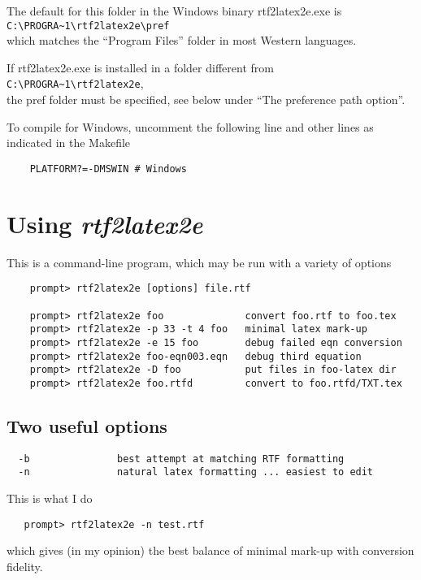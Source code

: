 \documentclass{article}
\def\rtf2latex2e{{\it rtf2latex2e}}
\begin{document}
The default for this folder in the Windows binary rtf2latex2e.exe is\\
\verb|C:\PROGRA~1\rtf2latex2e\pref|\\
which matches the ``Program Files'' folder in most Western languages.

If rtf2latex2e.exe is installed in a folder different from\\
\verb|C:\PROGRA~1\rtf2latex2e|,\\
the pref folder must be specified,
see below under ``The preference path option''.

To compile for Windows, uncomment the following line
and other lines as indicated in the Makefile
\begin{verbatim}
    PLATFORM?=-DMSWIN # Windows
\end{verbatim}

\section{Using \rtf2latex2e}

This is a command-line program, which may be run with a variety of options
\begin{verbatim}
    prompt> rtf2latex2e [options] file.rtf
    
    prompt> rtf2latex2e foo              convert foo.rtf to foo.tex
    prompt> rtf2latex2e -p 33 -t 4 foo   minimal latex mark-up
    prompt> rtf2latex2e -e 15 foo        debug failed eqn conversion
    prompt> rtf2latex2e foo-eqn003.eqn   debug third equation 
    prompt> rtf2latex2e -D foo           put files in foo-latex dir
    prompt> rtf2latex2e foo.rtfd         convert to foo.rtfd/TXT.tex
\end{verbatim}

\subsection{Two useful options}
\begin{verbatim}
  -b               best attempt at matching RTF formatting
  -n               natural latex formatting ... easiest to edit
\end{verbatim}
This is what I do
\begin{verbatim}
   prompt> rtf2latex2e -n test.rtf
\end{verbatim}
which gives (in my opinion) the best balance of minimal mark-up with conversion fidelity.
\end{document}
